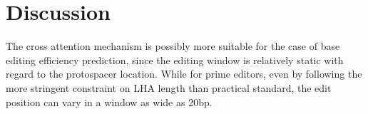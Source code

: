 \chapter{Discussion}

The cross attention mechanism is possibly more suitable for the case of base editing efficiency prediction, since the editing window is relatively static with regard to the protospacer location. While for prime editors, even by following the more stringent constraint on LHA length than practical standard, the edit position can vary in a window as wide as 20bp. 